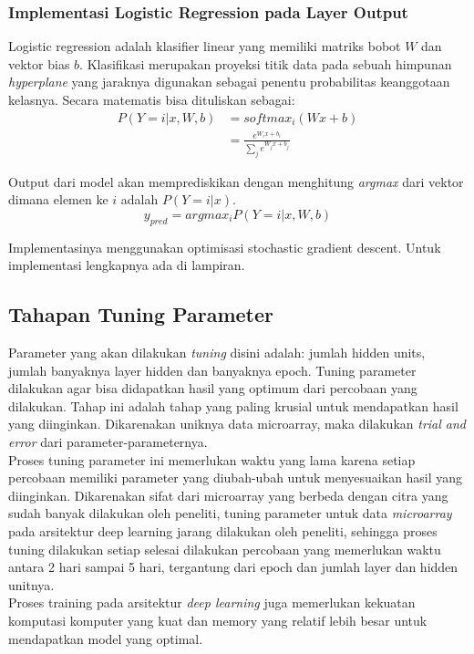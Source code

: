 \subsubsection{Implementasi Logistic Regression pada Layer Output}

Logistic regression adalah klasifier linear yang memiliki matriks bobot $W$ dan vektor bias $b$. Klasifikasi merupakan proyeksi titik data pada sebuah himpunan \textit{hyperplane} yang jaraknya digunakan sebagai penentu probabilitas keanggotaan kelasnya. Secara matematis bisa dituliskan sebagai:
\begin{equation}
\begin{aligned}
  P(Y=i|x, W,b) &= softmax_i(W x + b) \\
                &= \frac {e^{W_i x + b_i}} {\sum_j e^{W_j x + b_j}}
\end{aligned}
\end{equation}

Output dari model akan memprediskikan dengan menghitung \textit{argmax} dari vektor dimana elemen ke $i$ adalah $P(Y=i|x)$.
\begin{equation}
  y_{pred} = argmax_i  P(Y=i|x,W,b)
\end{equation}

Implementasinya menggunakan optimisasi stochastic gradient descent. Untuk implementasi lengkapnya ada di lampiran.

\subsection{Tahapan Tuning Parameter}
Parameter yang akan dilakukan \textit{tuning} disini adalah: jumlah hidden units, jumlah banyaknya layer hidden dan banyaknya epoch. Tuning parameter dilakukan agar bisa didapatkan hasil yang optimum dari percobaan yang dilakukan. Tahap ini adalah tahap yang paling krusial untuk mendapatkan hasil yang diinginkan. Dikarenakan uniknya data microarray, maka  dilakukan \textit{trial and error} dari parameter-parameternya.\\
Proses tuning parameter ini memerlukan waktu yang lama karena setiap percobaan memiliki parameter yang diubah-ubah untuk menyesuaikan hasil yang diinginkan. Dikarenakan sifat dari microarray yang berbeda dengan citra yang sudah banyak dilakukan oleh peneliti, tuning parameter untuk data \textit{microarray} pada arsitektur deep learning jarang dilakukan oleh peneliti, sehingga proses tuning dilakukan setiap selesai dilakukan percobaan yang memerlukan waktu antara 2 hari sampai 5 hari, tergantung dari epoch dan jumlah layer dan hidden unitnya.\\
Proses training pada arsitektur \textit{deep learning} juga memerlukan kekuatan komputasi komputer yang kuat dan memory yang relatif lebih besar untuk mendapatkan model yang optimal. 



